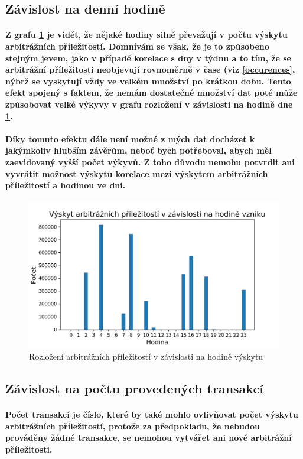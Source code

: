 \documentclass[thesis=B,czech]{FITthesis}[2019/03/21]
\begin{document}
\subsection{Závislost na denní hodině}
\paragraph{
Z grafu \ref{hours_distribution} je vidět, že nějaké hodiny silně převažují v počtu výskytu arbitrážních příležitostí. Domnívám se však, že je to způsobeno stejným jevem, jako v případě korelace s dny v týdnu a to tím, že se arbitrážní příležitosti neobjevují rovnoměrně v čase (viz \ref{occurences}, nýbrž se vyskytují vždy ve velkém množství po krátkou dobu. Tento efekt spojený s faktem, že nemám dostatečné množství dat poté může způsobovat velké výkyvy v grafu rozložení v závislosti na hodině dne \ref{hours_distribution}.
}
\paragraph{
Díky tomuto efektu dále není možné z mých dat docházet k jakýmkoliv hlubším závěrům, neboť bych potřeboval, abych měl zaevidovaný vyšší počet výkyvů. Z toho důvodu nemohu potvrdit ani vyvrátit možnost výskytu korelace mezi výskytem arbitrážních příležitostí a hodinou ve dni.
}
\begin{figure}\centering
	\includegraphics[width=1\textwidth]{images/hours_distribution.png}
	\caption{Rozložení arbitrážních příležitostí v závislosti na hodině výskytu }\label{hours_distribution}
\end{figure}
\subsection{Závislost na počtu provedených transakcí}
\paragraph{
Počet transakcí je číslo, které by také mohlo ovlivňovat počet výskytu arbitrážních příležitostí, protože za předpokladu, že nebudou prováděny žádné transakce, se nemohou vytvářet ani nové arbitrážní příležitosti.
}
\end{document}
